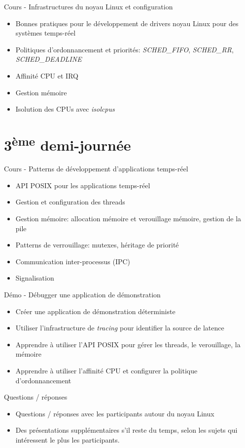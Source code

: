 \documentclass[a4paper,12pt,obeyspaces,spaces,hyphens]{article}
\begin{document}
\feagendaonecolumn
{Cours - Infrastructures du noyau Linux et configuration}
{
  \begin{itemize}
  \item Bonnes pratiques pour le développement de drivers noyau Linux
    pour des systèmes temps-réel
  \item Politiques d'ordonnancement et priorités: {\em SCHED\_FIFO},
    {\em SCHED\_RR}, {\em SCHED\_DEADLINE}
  \item Affinité CPU et IRQ
  \item Gestion mémoire
  \item Isolution des CPUs avec {\em isolcpus}
  \end{itemize}
}

\section{3\textsuperscript{ème} demi-journée}

\feagendatwocolumn
{Cours - Patterns de développement d'applications temps-réel}
{
  \begin{itemize}
  \item API POSIX pour les applications temps-réel
  \item Gestion et configuration des threads
  \item Gestion mémoire: allocation mémoire et verouillage mémoire, gestion de la pile
  \item Patterns de verrouillage: mutexes, héritage de priorité
  \item Communication inter-processus (IPC)
  \item Signalisation
  \end{itemize}
}
{Démo - Débugger une application de démonstration}
{
  \begin{itemize}
  \item Créer une application de démonstration déterministe
  \item Utiliser l'infrastructure de {\em tracing} pour identifier la source de latence
  \item Apprendre à utiliser l'API POSIX pour gérer les threads, le verouillage, la mémoire
  \item Apprendre à utiliser l'affinité CPU et configurer la politique d'ordonnancement
  \end{itemize}
}

\feagendaonecolumn
{Questions / réponses}
{
  \begin{itemize}
  \item Questions / réponses avec les participants autour du noyau Linux
  \item Des présentations supplémentaires s'il reste du temps, selon les sujets
	qui intéressent le plus les participants.
  \end{itemize}
}
\end{document}
